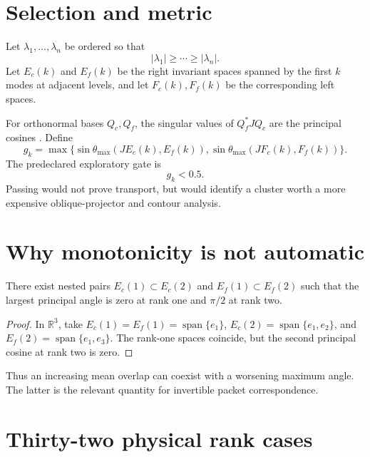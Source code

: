 \documentclass[12pt]{article}
\theoremstyle{remark}\newtheorem{remark}[theorem]{Remark}
\begin{document}
\section{Selection and metric}

Let $\lambda_1,\ldots,\lambda_n$ be ordered so that
\begin{equation}\label{eq:order}
 |\lambda_1|\ge\cdots\ge|\lambda_n|.
\end{equation}
Let $E_c(k)$ and $E_f(k)$ be the right invariant spaces spanned by the first
$k$ modes at adjacent levels, and let $F_c(k),F_f(k)$ be the corresponding
left spaces.

For orthonormal bases $Q_c,Q_f$, the singular values of $Q_f^*JQ_c$ are the
principal cosines \citep{StewartSun1990}.  Define
\begin{equation}\label{eq:joint}
 g_k=\max\{\sin\theta_{\max}(JE_c(k),E_f(k)),
 \sin\theta_{\max}(JF_c(k),F_f(k))\}.
\end{equation}
The predeclared exploratory gate is
\begin{equation}\label{eq:gate}
 g_k<0.5.
\end{equation}
Passing would not prove transport, but would identify a cluster worth a more
expensive oblique-projector and contour analysis.

\section{Why monotonicity is not automatic}

\begin{proposition}\label{prop:nonmono}
There exist nested pairs $E_c(1)\subset E_c(2)$ and
$E_f(1)\subset E_f(2)$ such that the largest principal angle is zero at rank
one and $\pi/2$ at rank two.
\end{proposition}

\begin{proof}
In $\mathbb R^3$, take
$E_c(1)=E_f(1)=\operatorname{span}\{e_1\}$,
$E_c(2)=\operatorname{span}\{e_1,e_2\}$, and
$E_f(2)=\operatorname{span}\{e_1,e_3\}$.  The rank-one spaces coincide, but
the second principal cosine at rank two is zero.
\end{proof}

Thus an increasing mean overlap can coexist with a worsening maximum angle.
The latter is the relevant quantity for invertible packet correspondence.

\section{Thirty-two physical rank cases}
\end{document}
